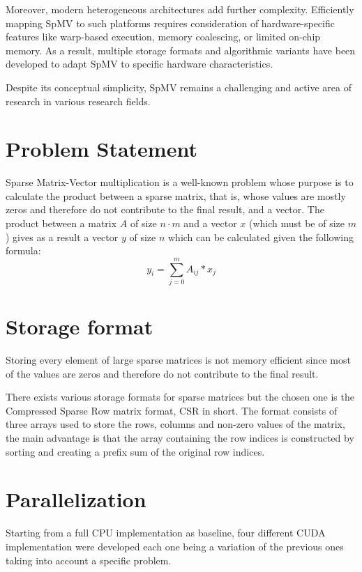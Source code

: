 \documentclass[conference]{IEEEtran}
\begin{document}
    Moreover, modern heterogeneous architectures add further complexity.
    Efficiently mapping SpMV to such platforms requires consideration of hardware-specific
    features like warp-based execution, memory coalescing, or limited on-chip memory.
    As a result, multiple storage formats and algorithmic variants have been developed
    to adapt SpMV to specific hardware characteristics.

    Despite its conceptual simplicity, SpMV remains a challenging and active area
    of research in various research fields.
    
    \section{Problem Statement}

    Sparse Matrix-Vector multiplication is a well-known problem whose purpose
    is to calculate the product between a sparse matrix, that is, whose values
    are mostly zeros and therefore do not contribute to the final result, and a
    vector.
    The product between a matrix $A$ of size $n \cdot m$ and a vector $x$ (which must
    be of size $m$) gives as a result a vector $y$ of size $n$ which can be calculated
given the following formula:
    $$
    y_i = \sum\limits_{j = 0}^{m} A_{ij} * x_j
    $$

    \section{Storage format}

    Storing every element of large sparse matrices is not memory efficient since
    most of the values are zeros and therefore do not contribute to the final result.

    There exists various storage formats for sparse matrices but the chosen one
    is the Compressed Sparse Row matrix format, CSR in short.
    The format consists of three arrays used to store the rows, columns and non-zero
    values of the matrix, the main advantage is that the array containing the row
    indices is constructed by sorting and creating a prefix sum of the original
    row indices.

    \section{Parallelization}

    Starting from a full CPU implementation as baseline, four different CUDA implementation
    were developed each one being a variation of the previous ones taking into
    account a specific problem.
\end{document}
